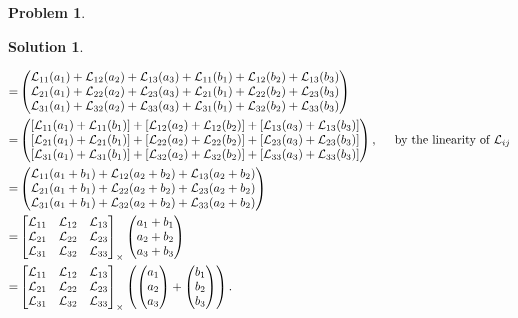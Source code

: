 \documentclass{article}
\theoremstyle{definition}
\newtheorem*{prob*}{Problem}
\newtheorem*{sln*}{Solution}
\newcommand{\lag}{\mathcal{L}}
\begin{document}
\begin{prob*}
\begin{sln*}
\begin{enumerate}
\begin{align*}
			=
			& \begin{pmatrix}
			\lag_{11}(a_1) + \lag_{12}(a_2) + \lag_{13}(a_3) + \lag_{11}(b_1) + \lag_{12}(b_2) + \lag_{13}(b_3)\\
			\lag_{21}(a_1) + \lag_{22}(a_2) + \lag_{23}(a_3) + \lag_{21}(b_1) + \lag_{22}(b_2) + \lag_{23}(b_3)\\
			\lag_{31}(a_1) + \lag_{32}(a_2) + \lag_{33}(a_3) + \lag_{31}(b_1) + \lag_{32}(b_2) + \lag_{33}(b_3)
			\end{pmatrix}\\
			=
			& \begin{pmatrix}
			[\lag_{11}(a_1) + \lag_{11}(b_1)] + [\lag_{12}(a_2) + \lag_{12}(b_2)] + [\lag_{13}(a_3) + \lag_{13}(b_3)]\\
			[\lag_{21}(a_1) + \lag_{21}(b_1)] + [\lag_{22}(a_2) + \lag_{22}(b_2)] + [\lag_{23}(a_3) + \lag_{23}(b_3)]\\
			[\lag_{31}(a_1) + \lag_{31}(b_1)] + [\lag_{32}(a_2) + \lag_{32}(b_2)] + [\lag_{33}(a_3) + \lag_{33}(b_3)]
			\end{pmatrix}, \hspace{0.5cm} \text{by the linearity of $\lag_{ij}$}\\
			=
			& \begin{pmatrix}
			\lag_{11}(a_1 + b_1) + \lag_{12}(a_2 + b_2) + \lag_{13}(a_2 + b_2)\\
			\lag_{21}(a_1 + b_1) + \lag_{22}(a_2 + b_2) + \lag_{23}(a_2 + b_2)\\
			\lag_{31}(a_1 + b_1) + \lag_{32}(a_2 + b_2) + \lag_{33}(a_2 + b_2)
			\end{pmatrix}\\
			=
			& \begin{bmatrix}
			\lag_{11} & \lag_{12} & \lag_{13}\\
			\lag_{21} & \lag_{22} & \lag_{23}\\
			\lag_{31} & \lag_{32} & \lag_{33}
			\end{bmatrix}_\times 
			\begin{pmatrix}
			a_1 + b_1\\a_2 + b_2\\a_3 + b_3
			\end{pmatrix}\\
			=
			& \begin{bmatrix}
			\lag_{11} & \lag_{12} & \lag_{13}\\
			\lag_{21} & \lag_{22} & \lag_{23}\\
			\lag_{31} & \lag_{32} & \lag_{33}
			\end{bmatrix}_\times
			\left( 
			\begin{pmatrix}
			a_1\\a_2\\a_3
			\end{pmatrix}
			+
			\begin{pmatrix}
			b_1\\b_2\\b_3
			\end{pmatrix}
			\right).
			\end{align*}  
			

\end{enumerate}
\end{sln*}
\end{prob*}
\end{document}
